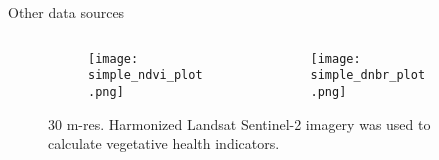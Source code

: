 \documentclass[aspectratio=169]{beamer}
\begin{document}
\begin{frame}{Other data sources}
\begin{figure}[h]
\begin{columns}
\begin{column}{0.48\linewidth}
    \begin{figure}[h]
    \centering
    \texttt{[image: simple\_ndvi\_plot.png]}
    \small
    \label{fig:simple_ndvi_plot}
    \end{figure}
\end{column}
\begin{column}{0.48\linewidth}
\begin{figure}[h]
    \centering
    \texttt{[image: simple\_dnbr\_plot.png]}
    \small
    \label{fig:simple_dnbr_plot}
    \end{figure}
\end{column}
\end{columns}
\caption{30 m-res. Harmonized Landsat Sentinel-2 imagery was used to calculate vegetative health indicators.}
\end{figure}


\end{frame}
\end{document}
